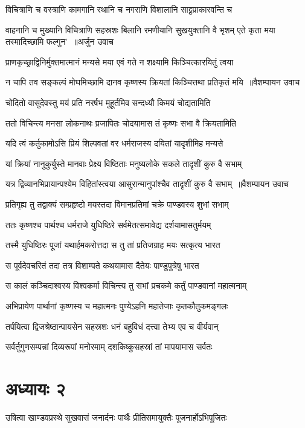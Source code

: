 \twolineshloka
{विचित्राणि च वस्त्राणि कामगानि रथानि च}
{नगराणि विशालानि साट्टप्राकारवन्ति च}


\fourlineindentedshloka
{वाहनानि च मुख्यानि विचित्राणि सहस्रशः}
{बिलानि रमणीयानि सुखयुक्तानि वै भृशम्}
{एते कृता मया तस्मादिच्छामि फल्गुन' ॥अर्जुन उवाच}
{}


\twolineshloka
{प्राणकृच्छ्राद्विनिर्मुक्तमात्मानं मन्यसे मया}
{एवं गते न शक्ष्यामि किञ्चित्कारयितुं त्वया}


\threelineshloka
{न चापि तव सङ्कल्पं मोघमिच्छामि दानव}
{कृष्णस्य क्रियतां किञ्चित्तथा प्रतिकृतं मयि ॥वैशम्पायन उवाच}
{}


\twolineshloka
{चोदितो वासुदेवस्तु मयं प्रति नरर्षभ}
{मुहूर्तमिव सन्दध्यौ किमयं चोद्यतामिति}


\twolineshloka
{ततो विचिन्त्य मनसा लोकनाथः प्रजापितः}
{चोदयामास तं कृष्णः सभा वै क्रियतामिति}


\twolineshloka
{यदि त्वं कर्तुकामोऽसि प्रियं शिल्पवतां वर}
{धर्मराजस्य दयितां यादृशीमिह मन्यसे}


\twolineshloka
{यां क्रियां नानुकुर्युस्ते मानवाः प्रेक्ष्य विष्ठिताः}
{मनुष्यलोके सकले तादृशीं कुरु वै सभाम्}


\threelineshloka
{यत्र द्विव्यानभिप्रायान्पश्येम विहितांस्त्वया}
{आसुरान्मानुपांश्चैव तादृशीं कुरु वै सभाम् ॥वैशम्पायन उवाच}
{}


\twolineshloka
{प्रतिगृह्य तु तद्वाक्यं सम्प्रहृष्टो मयस्तदा}
{विमानप्रतिमां चक्रे पाण्डवस्य शुभां सभाम्}


\twolineshloka
{ततः कृष्णश्च पार्थश्च धर्मराजे युधिष्ठिरे}
{सर्वमेतत्समावेद्य दर्शयामासतुर्मयम्}


\twolineshloka
{तस्मै युधिष्ठिरः पूजां यथार्हमकरोत्तदा}
{स तु तां प्रतिजग्राह मयः सत्कृत्य भारत}


\twolineshloka
{स पूर्वदेवचरितं तदा तत्र विशाम्पते}
{कथयामास दैतेयः पाण्डुपुत्रेषु भारत}


\twolineshloka
{स कालं कञ्चिदाश्वस्य विश्वकर्मा विचिन्त्य तु}
{सभां प्रचकमे कर्तुं पाण्डवानां महात्मनाम्}


\twolineshloka
{अभिप्रायेण पार्थानां कृष्णस्य च महात्मनः}
{पुण्येऽहनि महातेजाः कृतकौतुकमङ्गलः}


\twolineshloka
{तर्पयित्वा द्विजश्रेष्ठान्पायसेन सहस्रशः}
{धनं बहुविधं दत्त्वा तेभ्य एव च वीर्यवान्}


\twolineshloka
{सर्वर्तुगुणसम्पन्नां दिव्यरूपां मनोरमाम्}
{दशकिष्कुसहस्रां तां मापयामास सर्वतः}


\chapter{अध्यायः २}
\twolineshloka
{उषित्वा खाण्डवप्रस्थे सुखवासं जनार्दनः}
{पार्थैः प्रीतिसमायुक्तैः पूजनार्होऽभिपूजितः}


